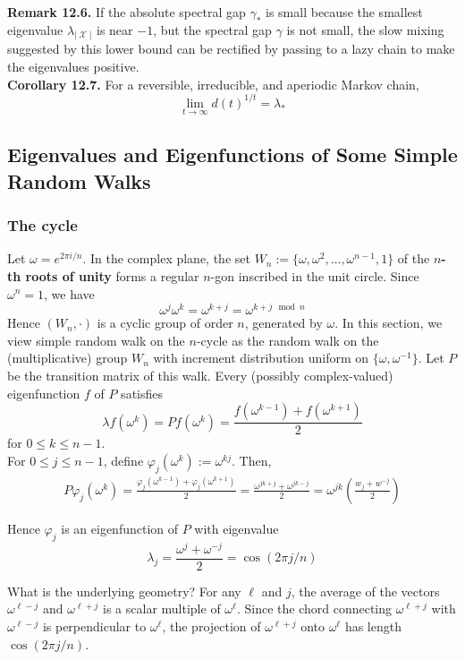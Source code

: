 \documentclass[12pt]{article}
\DeclareMathOperator*{\X}{\mathcal{X}}
\begin{document}
\textbf{Remark 12.6.} If the absolute spectral gap $\gamma_*$ is small because the smallest eigenvalue $\lambda_{|\X|}$ is near $-1$, but the spectral gap $\gamma$ is not small, the slow mixing suggested by this lower bound can be rectified by passing to a lazy chain to make the eigenvalues positive.\\

\textbf{Corollary 12.7.} For a reversible, irreducible, and aperiodic Markov chain, $$\lim_{t \to \infty} d(t)^{1/t} = \lambda_*$$

\subsection{Eigenvalues and Eigenfunctions of Some Simple Random Walks}

\subsubsection{The cycle} Let $\omega = e^{2\pi i/n}$. In the complex plane, the set $W_n := \{\omega, \omega^2, \ldots, \omega^{n-1}, 1\}$ of the $n$\textbf{-th roots of unity} forms a regular $n$-gon inscribed in the unit circle. Since $\omega^n = 1$, we have $$\omega^j \omega^k = \omega^{k+j} = \omega^{k + j \mod n}$$ Hence $(W_n, \cdot)$ is a cyclic group of order $n$, generated by $\omega$. In this section, we view simple random walk on the $n$-cycle as the random walk on the (multiplicative) group $W_n$ with increment distribution uniform on $\{\omega, \omega^{-1}\}$. Let $P$ be the transition matrix of this walk. Every (possibly complex-valued) eigenfunction $f$ of $P$ satisfies $$\lambda f(\omega^k) = Pf(\omega^k) = \frac{f(\omega^{k-1}) + f(\omega^{k+1})}{2}$$ for $0 \leq k \leq n-1$.\\

For $0 \leq j \leq n-1$, define $\varphi_j(\omega^k) := \omega^{kj}$. Then,
\begin{align*}
P\varphi_j(\omega^k) = \frac{\varphi_j(\omega^{k-1}) + \varphi_j(\omega^{k+1})}{2} = \frac{\omega^{jk + j} + \omega^{jk-j}}{2} = \omega^{jk} \left( \frac{w_j + w^{-j}}{2} \right)
\end{align*}

Hence $\varphi_j$ is an eigenfunction of $P$ with eigenvalue $$\lambda_j = \frac{\omega^j + \omega^{-j}}{2} = \cos(2\pi j/n)$$

What is the underlying geometry? For any $\ell$ and $j$, the average of the vectors $\omega^{\ell - j}$ and $\omega^{\ell + j}$ is a scalar multiple of $\omega^{\ell}$. Since the chord connecting $\omega^{\ell + j}$ with $\omega^{\ell - j}$ is perpendicular to $\omega^{\ell}$, the projection of $\omega^{\ell + j}$ onto $\omega^{\ell}$ has length $\cos(2 \pi j/n)$.\\
\end{document}
